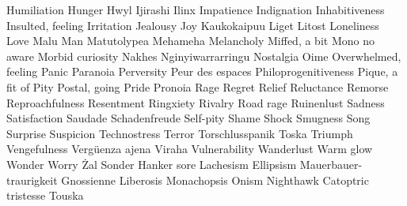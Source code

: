 \documentclass[a4paper]{article}
\begin{document}
	 Humiliation
	 Hunger
	 Hwyl
	 Ijirashi
	 Ilinx
	 Impatience
	 Indignation
	 Inhabitiveness
	 Insulted, feeling
	 Irritation
	 Jealousy
	 Joy
	 Kaukokaipuu
	 Liget
	 Litost
	 Loneliness
	 Love
	 Malu
	 Man
	 Matutolypea
	 Mehameha
	 Melancholy
	 Miffed, a bit
	 Mono no aware
	 Morbid curiosity
	 Nakhes
	 Nginyiwarrarringu
	 Nostalgia
	 Oime
	 Overwhelmed, feeling
	 Panic
	 Paranoia
	 Perversity
	 Peur des espaces
	 Philoprogenitiveness
	 Pique, a fit of
	 Pity
	 Postal, going
	 Pride
	 Pronoia
	 Rage
	 Regret
	 Relief
	 Reluctance
	 Remorse
	 Reproachfulness
	 Resentment
	 Ringxiety
	 Rivalry
	 Road rage
	 Ruinenlust
	 Sadness
	 Satisfaction
	 Saudade
	 Schadenfreude
   Self-pity
	 Shame
	 Shock
	 Smugness
	 Song
	 Surprise
	 Suspicion
	 Technostress
	 Terror
	 Torschlusspanik
	 Toska
	 Triumph
	 Vengefulness
	 Vergüenza ajena
	 Viraha
	 Vulnerability
	 Wanderlust
 	 Warm glow
	 Wonder
	 Worry
	 Żal
	 Sonder
	 Hanker sore
	 Lachesism
	 Ellipsism
	 Mauerbauer-traurigkeit
	 Gnossienne
	 Liberosis
	 Monachopsis
	 Onism
	 Nighthawk
	 Catoptric tristesse
	 Touska
\newpage
\end{document}
